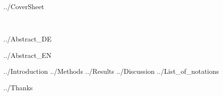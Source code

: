 \documentclass[class=article, crop=false, 11pt]{standalone}
\begin{document}
	
	{../CoverSheet}
	\newpage
	\
	\thispagestyle{empty}
	\newpage

	

	\newpage
	\
	\thispagestyle{empty}
	\newpage

	{../Abstract_DE}
	\newpage
	\
	\thispagestyle{empty}
	\newpage

	{../Abstract_EN}
	\newpage
	\
	\thispagestyle{empty}
	\newpage

	\tableofcontents
	\clearpage

	{../Introduction}
	\clearpage
	{../Methods}
	\clearpage
	{../Results}
	\clearpage
	{../Discussion}
	\clearpage
	{../List_of_notations}
	\clearpage
	\listoffigures
	\clearpage
	{../Thanks}
	\clearpage

	\nocite{*}
	
	
	
\end{document}
